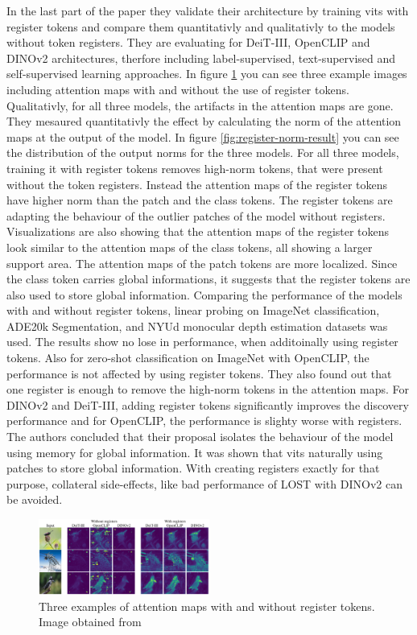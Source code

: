 \documentclass[conference]{IEEEtran}
\begin{document}
  In the last part of the paper they validate their architecture by training \acp{vit} with register tokens and compare them  quantitativly and qualitativly to the models without token registers. They are evaluating for \mbox{DeiT-III}, \mbox{OpenCLIP} and \mbox{DINOv2} architectures, therfore including label-supervised, text-supervised and self-supervised learning approaches. In figure \ref{fig:register-result} you can see three example images including attention maps with and without the use of register tokens. Qualitativly, for all three models, the artifacts in the attention maps are gone. They mesaured quantitativly the effect by calculating the norm of the attention maps at the output of the model. In figure \ref{fig:register-norm-result} you can see the distribution of the output norms for the three models. For all three models, training it with register tokens removes high-norm tokens, that were present without the token registers. Instead the attention maps of the register tokens have  higher norm than the patch and the class tokens. The register tokens are adapting the behaviour of the outlier patches of the model without registers. Visualizations are also showing that the attention maps of the register tokens look similar to the attention maps of the class tokens, all showing a larger support area. The attention maps of the patch tokens are more localized. Since the class token carries global informations, it suggests that the register tokens are also used to store global information. 
  Comparing the performance of the models with and without register tokens, linear probing on ImageNet classification, ADE20k Segmentation, and NYUd monocular depth estimation datasets was used. The results show no lose in performance, when additoinally using register tokens. Also for zero-shot classification on ImageNet with \mbox{OpenCLIP}, the performance is not affected by using register tokens. They also found out that one register is enough to remove the high-norm tokens in the attention maps. For \mbox{DINOv2} and \mbox{DeiT-III}, adding register tokens significantly improves the discovery performance and for \mbox{OpenCLIP}, the performance is slighty worse with registers. The authors concluded that their proposal isolates the behaviour of the model using memory for global information. It was shown that \acp{vit} naturally using patches to store global information. With creating registers exactly for that purpose, collateral side-effects, like bad performance of \mbox{LOST} with \mbox{DINOv2} can be avoided.

  \begin{figure}
    \centering
    \includegraphics[width=0.5\textwidth]{figures/register-result.png}
    \caption{Three examples of attention maps with and without register tokens. Image obtained from \cite{registers}}
    \label{fig:register-result}
  \end{figure}
\end{document}
